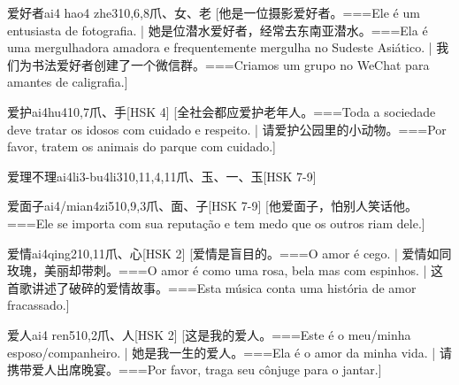 \begin{EntryWithPhonetic}{爱好者}{ai4 hao4 zhe3}{10,6,8}{⽖、⼥、⽼}
  [他是一位摄影爱好者。===Ele é um entusiasta de fotografia. | 她是位潜水爱好者，经常去东南亚潜水。===Ela é uma mergulhadora amadora e frequentemente mergulha no Sudeste Asiático.  | 我们为书法爱好者创建了一个微信群。===Criamos um grupo no WeChat para amantes de caligrafia.]
\end{EntryWithPhonetic}

\begin{EntryWithPhonetic}{爱护}{ai4hu4}{10,7}{⽖、⼿}[HSK 4]
  [全社会都应爱护老年人。===Toda a sociedade deve tratar os idosos com cuidado e respeito. | 请爱护公园里的小动物。===Por favor, tratem os animais do parque com cuidado.]
\end{EntryWithPhonetic}

\begin{EntryWithPhonetic}{爱理不理}{ai4li3-bu4li3}{10,11,4,11}{⽖、⽟、⼀、⽟}[HSK 7-9]
\end{EntryWithPhonetic}

\begin{EntryWithPhonetic}{爱面子}{ai4/mian4zi5}{10,9,3}{⽖、⾯、⼦}[HSK 7-9]
  [他爱面子，怕别人笑话他。===Ele se importa com sua reputação e tem medo que os outros riam dele.]
\end{EntryWithPhonetic}

\begin{EntryWithPhonetic}{爱情}{ai4qing2}{10,11}{⽖、⼼}[HSK 2]
  [爱情是盲目的。===O amor é cego. | 爱情如同玫瑰，美丽却带刺。===O amor é como uma rosa, bela mas com espinhos.  | 这首歌讲述了破碎的爱情故事。===Esta música conta uma história de amor fracassado.]
\end{EntryWithPhonetic}

\begin{EntryWithPhonetic}{爱人}{ai4 ren5}{10,2}{⽖、⼈}[HSK 2]
  [这是我的爱人。===Este é o meu/minha esposo/companheiro. | 她是我一生的爱人。===Ela é o amor da minha vida. | 请携带爱人出席晚宴。===Por favor, traga seu cônjuge para o jantar.]
\end{EntryWithPhonetic}

